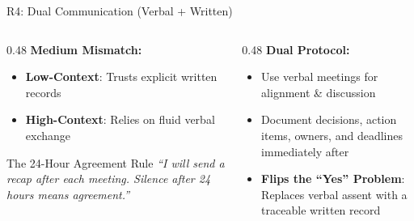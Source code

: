 \documentclass[aspectratio=169, 12pt]{beamer}
\newcommand{\presenter}[1]{\gdef\currentpresenter{#1}}
\gdef\currentpresenter{}
\begin{document}
\begin{frame}{R4: Dual Communication (Verbal + Written)}
\presenter{Presenter: Hemanth Kumar KOKUTAM}

\vspace{0.3em}

\begin{columns}[T]
\begin{column}{0.48\textwidth}
\textbf{Medium Mismatch:}
\begin{itemize}
    \item \textbf{Low-Context}: Trusts explicit written records
    \item \textbf{High-Context}: Relies on fluid verbal exchange
\end{itemize}
\vspace{0.5em}
\begin{block}{The 24-Hour Agreement Rule}
\textit{``I will send a recap after each meeting. Silence after 24 hours means agreement.''}
\end{block}
\end{column}

\begin{column}{0.48\textwidth}
\textbf{Dual Protocol:}
\begin{itemize}
    \item Use verbal meetings for alignment \& discussion
    \item Document decisions, action items, owners, and deadlines immediately after
    \item \textbf{Flips the ``Yes'' Problem}: Replaces verbal assent with a traceable written record
\end{itemize}
\end{column}
\end{columns}

\end{frame}
\end{document}
